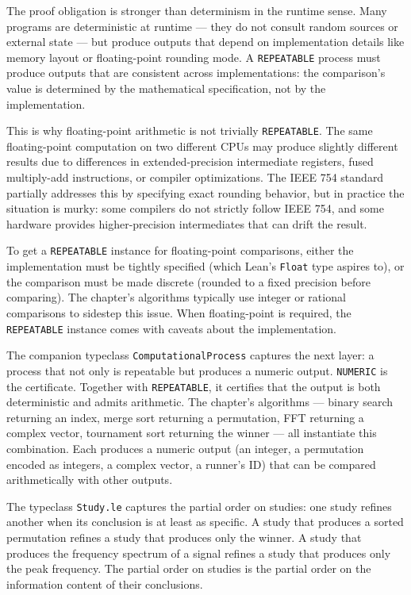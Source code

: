 The proof obligation is stronger than determinism in the runtime sense.
Many programs are deterministic at runtime --- they do not consult random
sources or external state --- but produce outputs that depend on
implementation details like memory layout or floating-point rounding mode.
A \texttt{REPEATABLE} process must produce outputs that are consistent
across implementations: the comparison's value is determined by the
mathematical specification, not by the implementation.

This is why floating-point arithmetic is not trivially
\texttt{REPEATABLE}. The same floating-point computation on two different
CPUs may produce slightly different results due to differences in
extended-precision intermediate registers, fused multiply-add instructions,
or compiler optimizations. The IEEE 754 standard partially addresses this
by specifying exact rounding behavior, but in practice the situation is
murky: some compilers do not strictly follow IEEE 754, and some hardware
provides higher-precision intermediates that can drift the result.

To get a \texttt{REPEATABLE} instance for floating-point comparisons,
either the implementation must be tightly specified (which Lean's
\texttt{Float} type aspires to), or the comparison must be made discrete
(rounded to a fixed precision before comparing). The chapter's algorithms
typically use integer or rational comparisons to sidestep this issue. When
floating-point is required, the \texttt{REPEATABLE} instance comes with
caveats about the implementation.

The companion typeclass \texttt{ComputationalProcess} captures the next
layer: a process that not only is repeatable but produces a numeric
output. \texttt{NUMERIC} is the certificate. Together with
\texttt{REPEATABLE}, it certifies that the output is both deterministic
and admits arithmetic. The chapter's algorithms --- binary search returning
an index, merge sort returning a permutation, FFT returning a complex
vector, tournament sort returning the winner --- all instantiate this
combination. Each produces a numeric output (an integer, a permutation
encoded as integers, a complex vector, a runner's ID) that can be compared
arithmetically with other outputs.

The typeclass \texttt{Study.le} captures the partial order on studies:
one study refines another when its conclusion is at least as specific. A
study that produces a sorted permutation refines a study that produces
only the winner. A study that produces the frequency spectrum of a signal
refines a study that produces only the peak frequency. The partial order
on studies is the partial order on the information content of their
conclusions.

